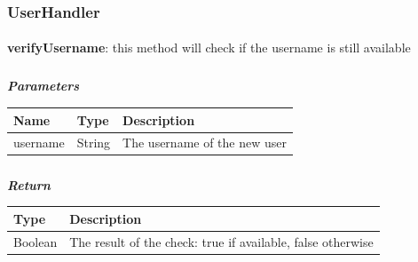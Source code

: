 				\subsubsection{UserHandler}
					\paragraph{}
					\vspace{-2mm}
							\textbf{verifyUsername}: this method will check if the username is still available
							\subparagraph{}
							\vspace{-3mm}
							\textit{\textbf{Parameters}}
							\vspace{-2mm}
								\begin{table}[!h]
									\begin{tabular}{L{0.2\textwidth}L{0.15\textwidth}L{0.45\textwidth}}
										\toprule
										\textbf{Name} & \textbf{Type} & \textbf{Description} \\
										\midrule
								  		username & String & The username of the new user \\
								 		\bottomrule
									\end{tabular}
								\end{table}
							\vspace{-6mm}
							\subparagraph{}
							\vspace{-3mm}
							\textit{\textbf{Return}}
							\vspace{-2mm}
								\begin{table}[!h]
									\begin{tabular}{L{0.15\textwidth}L{0.45\textwidth}}
										\toprule
									 	\textbf{Type} & \textbf{Description} \\
										\midrule
								  		Boolean & The result of the check: true if available, false otherwise\\
								 		\bottomrule
									\end{tabular}
								\end{table}
							\vspace{-6mm}
					
